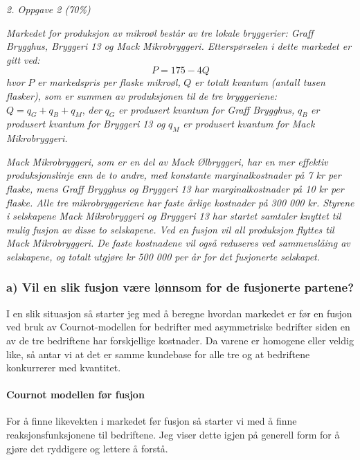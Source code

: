 \documentclass[
  12pt,
  a4paper,
  DIV=11,
  numbers=noendperiod]{scrartcl}
\let\oldparagraph\paragraph
\renewcommand{\paragraph}[1]{\oldparagraph{#1}\mbox{}}
\begin{document}
\begin{center}
    \Large
    \textit{2.  Oppgave 2 (70\%)}
\end{center}

\textit{Markedet for produksjon av mikroøl består av tre lokale bryggerier: Graff Brygghus, Bryggeri 13 og Mack Mikrobryggeri. Etterspørselen i dette markedet er gitt ved:} 
$$
P = 175-4Q
$$ 
\textit{hvor }$P$ \textit{er markedspris per flaske mikroøl,} $Q$ \textit{er totalt kvantum (antall tusen flasker), som er summen av produksjonen til de tre bryggeriene: }$Q = q_G + q_B + q_M$, \textit{der }$q_G$ \textit{er produsert kvantum for Graff Brygghus,} $q_B$ \textit{er produsert kvantum for Bryggeri 13 og} $q_M$ \textit{er produsert kvantum for Mack Mikrobryggeri.}

\textit{Mack Mikrobryggeri, som er en del av Mack Ølbryggeri, har en mer effektiv produksjonslinje enn de to andre, med konstante marginalkostnader på 7 kr per flaske, mens Graff Brygghus og Bryggeri 13 har marginalkostnader på 10 kr per flaske. Alle tre mikrobryggeriene har faste årlige kostnader på 300 000 kr. Styrene i selskapene Mack Mikrobryggeri og Bryggeri 13 har startet samtaler knyttet til mulig fusjon av disse to selskapene. Ved en fusjon vil all produksjon flyttes til Mack Mikrobryggeri. De faste kostnadene vil også reduseres ved sammenslåing av selskapene, og totalt utgjøre kr 500 000 per år for det fusjonerte selskapet.}

\subsubsection{a) Vil en slik fusjon være lønnsom for de fusjonerte
partene?}\label{a-vil-en-slik-fusjon-vuxe6re-luxf8nnsom-for-de-fusjonerte-partene}

I en slik situasjon så starter jeg med å beregne hvordan markedet er før
en fusjon ved bruk av Cournot-modellen for bedrifter med asymmetriske
bedrifter siden en av de tre bedriftene har forskjellige kostnader. Da
varene er homogene eller veldig like, så antar vi at det er samme
kundebase for alle tre og at bedriftene konkurrerer med kvantitet.

\paragraph{Cournot modellen før
fusjon}\label{cournot-modellen-fuxf8r-fusjon}

For å finne likevekten i markedet før fusjon så starter vi med å finne
reaksjonsfunksjonene til bedriftene. Jeg viser dette igjen på generell
form for å gjøre det ryddigere og lettere å forstå.
\end{document}
